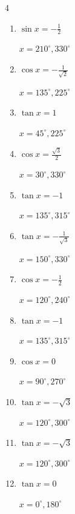 \begin{multicols}{4}
\begin{enumerate}
  \item $\displaystyle \sin{x}  = -\frac{1}{2}$

        $\displaystyle x = 210^{\circ} , 330^{\circ}$

  \item $\displaystyle \cos{x}  = -\frac{1}{\sqrt{2}}$

        $\displaystyle x = 135^{\circ} , 225^{\circ}$

  \item $\displaystyle \tan{x}  = 1$

        $\displaystyle x = 45^{\circ} , 225^{\circ}$

  \item $\displaystyle \cos{x}  = \frac{\sqrt{3}}{2}$

        $\displaystyle x = 30^{\circ} , 330^{\circ}$

  \item $\displaystyle \tan{x}  = -1$

        $\displaystyle x = 135^{\circ} , 315^{\circ}$

  \item $\displaystyle \tan{x}  = -\frac{1}{\sqrt{3}}$

        $\displaystyle x = 150^{\circ} , 330^{\circ}$

  \item $\displaystyle \cos{x}  = -\frac{1}{2}$

        $\displaystyle x = 120^{\circ} , 240^{\circ}$

  \item $\displaystyle \tan{x}  = -1$

        $\displaystyle x = 135^{\circ} , 315^{\circ}$

  \item $\displaystyle \cos{x}  = 0$

        $\displaystyle x = 90^{\circ} , 270^{\circ}$

  \item $\displaystyle \tan{x}  = -\sqrt{3}$

        $\displaystyle x = 120^{\circ} , 300^{\circ}$

  \item $\displaystyle \tan{x}  = -\sqrt{3}$

        $\displaystyle x = 120^{\circ} , 300^{\circ}$

  \item $\displaystyle \tan{x}  = 0$

        $\displaystyle x = 0^{\circ} , 180^{\circ}$


\end{enumerate}
\end{multicols}
